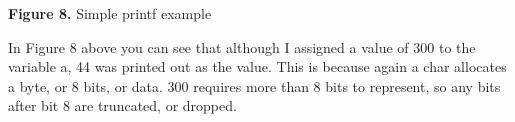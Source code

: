 \documentclass[paper=a4, fontsize=11pt]{scrartcl}
\numberwithin{equation}{section}		%
\numberwithin{figure}{section}			%
\numberwithin{table}{section}			%
\begin{document}
\vskip 0.05in
\centerline{\textbf{Figure 8. }Simple printf example}
\vskip 0.1in
In Figure 8 above you can see that although I assigned a value of 300 to the variable a, 44 was printed out as the value. This is because again a char allocates a byte, or 8 bits, or data. 300 requires more than 8 bits to represent, so any bits after bit 8 are truncated, or dropped. 

\end{document}
